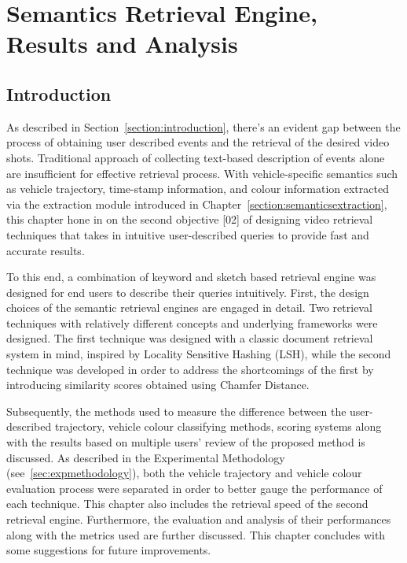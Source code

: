 
\chapter{Semantics Retrieval Engine, Results and Analysis}

\label{section:retrievalengine}
\section{Introduction}

As described in Section~\ref{section:introduction}, there's an evident gap between the process of obtaining user described events and the retrieval of the desired video shots. Traditional approach of collecting text-based description of events alone are insufficient for effective retrieval process.
With vehicle-specific semantics such as vehicle trajectory, time-stamp information, and colour information extracted via the extraction module introduced in Chapter~\ref{section:semanticsextraction},
this chapter hone in on the second objective [02] of designing video retrieval techniques that takes in intuitive user-described queries to provide fast and accurate results.

To this end, a combination of keyword and sketch based retrieval engine was designed for end users to describe their queries intuitively.
First, the design choices of the semantic retrieval engines are engaged in detail. Two retrieval techniques with relatively different concepts and underlying frameworks were designed.
The first technique was designed with a classic document retrieval system in mind, inspired by Locality Sensitive Hashing (LSH), while the second technique was developed in order to address the shortcomings of the first by introducing similarity scores obtained using Chamfer Distance.

Subsequently, the methods used to measure the difference between the user-described trajectory, vehicle colour classifying methods, scoring systems along with the results based on multiple users' review of the proposed method is discussed.
As described in the Experimental Methodology (see~\ref{sec:expmethodology}), both the vehicle trajectory and vehicle colour evaluation process were separated in order to better gauge the performance of each technique.
This chapter also includes the retrieval speed of the second retrieval engine.
Furthermore, the evaluation and analysis of their performances along with the metrics used are further discussed. This chapter concludes with some suggestions for future improvements.

